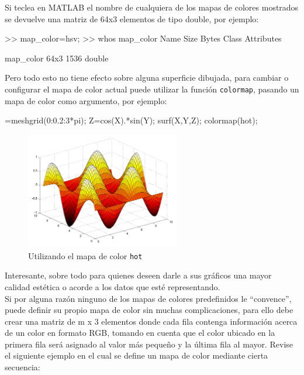 Si teclea en MATLAB el nombre de cualquiera de los mapas de colores
mostrados se devuelve una matriz de 64x3 elementos de tipo double, por
ejemplo:

\begin{matlab}
>> map_color=hsv;
>> whos map_color
  Name            Size            Bytes  Class     Attributes

  map_color      64x3              1536  double          
\end{matlab}

Pero todo esto no tiene efecto sobre alguna superficie dibujada, para
cambiar o configurar el mapa de color actual puede utilizar la función
\texttt{colormap}, pasando un mapa de color como argumento, por ejemplo:

\begin{matlab}
[X,Y]=meshgrid(0:0.2:3*pi);
Z=cos(X).*sin(Y);
surf(X,Y,Z);
colormap(hot);
\end{matlab}

\begin{figure}[htbp]
    \centering
    \includegraphics[width=0.6\textwidth]{images/ch4/img_4_10.png}
    \caption{Utilizando el mapa de color \texttt{hot}}
    \label{fig:label}
\end{figure}

Interesante, sobre todo para quienes deseen darle a sus gráficos una
mayor calidad estética o acorde a los datos que esté representando. \\

Si por alguna razón ninguno de los mapas de colores predefinidos le
``convence'', puede definir su propio mapa de color sin muchas
complicaciones, para ello debe crear una matriz de m x 3 elementos donde
cada fila contenga información acerca de un color en formato RGB,
tomando en cuenta que el color ubicado en la primera fila será asignado
al valor más pequeño y la última fila al mayor. Revise el siguiente
ejemplo en el cual se define un mapa de color mediante cierta secuencia:

